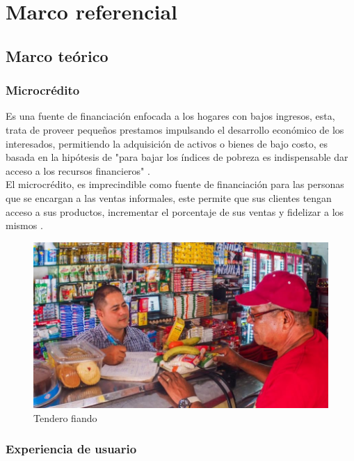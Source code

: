\section{Marco referencial}

	\subsection{Marco teórico}
	
		\subsubsection{Microcrédito}
		
		{Es una fuente de financiación enfocada a los hogares con bajos ingresos, esta, trata de proveer pequeños prestamos impulsando el desarrollo económico de los interesados, permitiendo la adquisición de activos o bienes de bajo costo, es basada en la hipótesis de "para bajar los índices de pobreza es indispensable dar acceso a los recursos financieros" \cite{MaricruzMicro,BarbaraMicro}.\\
		
		El microcrédito, es imprecindible como fuente de financiación para las personas que se encargan a las ventas informales, este permite que sus clientes tengan acceso a sus productos, incrementar el porcentaje de sus ventas y fidelizar a los mismos \cite{LupeTrust}.\\
	
		\begin{figure}[H]
			\centering
			\includegraphics[width=0.8\linewidth]{description/framework/tendero.jpg}
			\caption{Tendero fiando}
		\end{figure}
		}
	
	
		\subsubsection{Experiencia de usuario}
		
